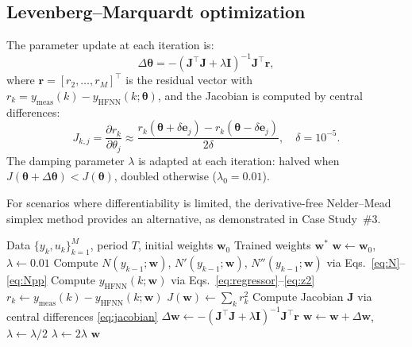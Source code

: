 \documentclass[preprint,12pt]{elsarticle}
\begin{document}
\subsection{Levenberg--Marquardt optimization}
The parameter update at each iteration is:
\begin{equation}
\Delta\boldsymbol{\theta} = -(\mathbf{J}^\top\mathbf{J} + \lambda\mathbf{I})^{-1}\mathbf{J}^\top\mathbf{r},
\label{eq:lm_update}
\end{equation}
where $\mathbf{r} = [r_2, \ldots, r_M]^\top$ is the residual vector with $r_k = y_{\mathrm{meas}}(k) - y_{\mathrm{HFNN}}(k;\boldsymbol{\theta})$, and the Jacobian is computed by central differences:
\begin{equation}
J_{k,j} = \frac{\partial r_k}{\partial \theta_j} \approx \frac{r_k(\boldsymbol{\theta}+\delta\mathbf{e}_j) - r_k(\boldsymbol{\theta}-\delta\mathbf{e}_j)}{2\delta}, \quad \delta = 10^{-5}.
\label{eq:jacobian}
\end{equation}
The damping parameter $\lambda$ is adapted at each iteration: halved when $J(\boldsymbol{\theta}+\Delta\boldsymbol{\theta}) < J(\boldsymbol{\theta})$, doubled otherwise ($\lambda_0 = 0.01$).

For scenarios where differentiability is limited, the derivative-free Nelder--Mead simplex method provides an alternative, as demonstrated in Case Study~\#3.

\begin{algorithm}[t]
\caption{HFNN Training via Levenberg--Marquardt}
\label{alg:training}
\begin{algorithmic}[1]
\REQUIRE Data $\{y_k, u_k\}_{k=1}^{M}$, period $T$, initial weights $\mathbf{w}_0$
\ENSURE Trained weights $\mathbf{w}^*$
\STATE $\mathbf{w} \leftarrow \mathbf{w}_0$, $\lambda \leftarrow 0.01$
    \STATE Compute $N(y_{k-1};\mathbf{w})$, $N'(y_{k-1};\mathbf{w})$, $N''(y_{k-1};\mathbf{w})$ via Eqs.~\eqref{eq:N}--\eqref{eq:Npp}
    \STATE Compute $y_{\mathrm{HFNN}}(k;\mathbf{w})$ via Eqs.~\eqref{eq:regressor}--\eqref{eq:z2}
    \STATE $r_k \leftarrow y_{\mathrm{meas}}(k) - y_{\mathrm{HFNN}}(k;\mathbf{w})$
  \ENDFOR
  \STATE $J(\mathbf{w}) \leftarrow \sum_k r_k^2$
  \STATE Compute Jacobian $\mathbf{J}$ via central differences \eqref{eq:jacobian}
  \STATE $\Delta\mathbf{w} \leftarrow -(\mathbf{J}^\top\mathbf{J} + \lambda\mathbf{I})^{-1}\mathbf{J}^\top\mathbf{r}$
    \STATE $\mathbf{w} \leftarrow \mathbf{w} + \Delta\mathbf{w}$, $\lambda \leftarrow \lambda/2$
  \ELSE
    \STATE $\lambda \leftarrow 2\lambda$
  \ENDIF
\ENDFOR
\RETURN $\mathbf{w}$
\end{algorithmic}
\end{algorithm}
\end{document}
